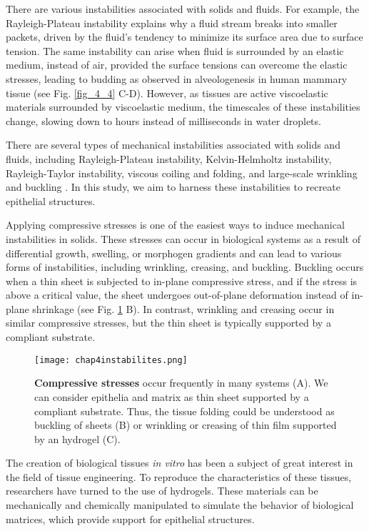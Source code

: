There are various instabilities associated with solids and fluids. For example, the Rayleigh-Plateau instability explains why a fluid stream breaks into smaller packets, driven by the fluid's tendency to minimize its surface area due to surface tension. The same instability can arise when fluid is surrounded by an elastic medium, instead of air, provided the surface tensions can overcome the elastic stresses, leading to budding as observed in alveologenesis in human mammary tissue \cite{fernandez2021} (see Fig. \ref{fig_4_4} C-D). However, as tissues are active viscoelastic materials surrounded by viscoelastic medium, the timescales of these instabilities change, slowing down to hours instead of milliseconds in water droplets.

There are several types of mechanical instabilities associated with solids and fluids, including Rayleigh-Plateau instability, Kelvin-Helmholtz instability, Rayleigh-Taylor instability, viscous coiling and folding, and large-scale wrinkling and buckling \cite{gallaire2017, kourouklis2018}. In this study, we aim to harness these instabilities to recreate epithelial structures.

Applying compressive stresses is one of the easiest ways to induce mechanical instabilities in solids. These stresses can occur in biological systems as a result of differential growth, swelling, or morphogen gradients and can lead to various forms of instabilities, including wrinkling, creasing, and buckling. Buckling occurs when a thin sheet is subjected to in-plane compressive stress, and if the stress is above a critical value, the sheet undergoes out-of-plane deformation instead of in-plane shrinkage (see Fig. \ref{fig_4_5} B). In contrast, wrinkling and creasing occur in similar compressive stresses, but the thin sheet is typically supported by a compliant substrate.

\begin{figure}
	\centering
	\texttt{[image: chap4instabilites.png]}
	\caption{\label{fig_4_5} \textbf{Compressive stresses} occur frequently in many systems (A). We can consider epithelia and matrix as thin sheet supported by a compliant substrate. Thus, the tissue folding could be understood as buckling of sheets (B) or wrinkling or creasing of thin film supported by an hydrogel (C).}
\end{figure}

The creation of biological tissues \textit{in vitro} has been a subject of great interest in the field of tissue engineering. To reproduce the characteristics of these tissues, researchers have turned to the use of hydrogels. These materials can be mechanically and chemically manipulated to simulate the behavior of biological matrices, which provide support for epithelial structures.

